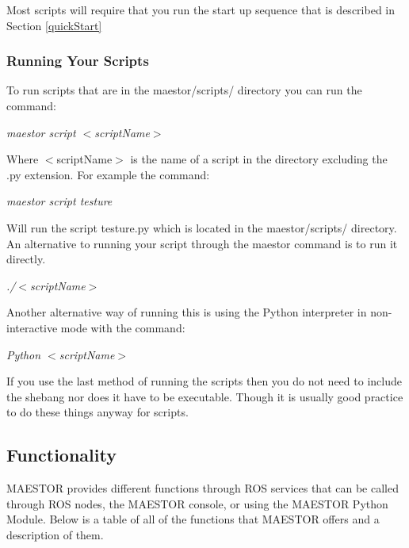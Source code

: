 \documentclass[12pt]{article}
\begin{document}
Most scripts will require that you run the start up sequence that is described in Section \ref{quickStart}

\subsubsection{Running Your Scripts}


To run scripts that are in the maestor/scripts/ directory you can run the command: 

\begin{center}
	\textit{maestor script $<$scriptName$>$}
\end{center}

Where $<$scriptName$>$ is the name of a script in the directory excluding the .py extension. For example the command:

\begin{center}
	\textit{maestor script testure}
\end{center}

Will run the script testure.py which is located in the maestor/scripts/ directory. An alternative to running your script through the maestor command is to run it directly. 

\begin{center}
	\textit{./$<$scriptName$>$}
\end{center}

Another alternative way of running this is using the Python interpreter in non-interactive mode with the command:

\begin{center}
	\textit{Python $<$scriptName$>$}
\end{center}

If you use the last method of running the scripts then you do not need to include the shebang nor does it have to be executable. Though it is usually good practice to do these things anyway for scripts. 

\subsection{Functionality}

MAESTOR provides different functions through ROS services that can be called through ROS nodes, the MAESTOR console, or using the MAESTOR Python Module. Below is a table of all of the functions that MAESTOR offers and a description of them. 
\end{document}

